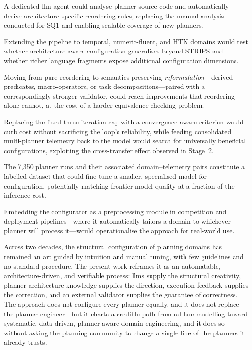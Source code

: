 \begin{description}[style=nextline, leftmargin=0.3cm]
  \item[\textbf{Automated rule extraction.}]
        A dedicated \gls{llm} agent could analyse planner source code and automatically derive architecture-specific reordering rules, replacing the manual analysis conducted for SQ1 and enabling scalable coverage of new planners.

  \item[\textbf{Broader planning formalisms.}]
        Extending the pipeline to temporal, numeric-fluent, and HTN domains would test whether architecture-aware configuration generalises beyond STRIPS and whether richer language fragments expose additional configuration dimensions.

  \item[\textbf{Beyond reordering.}]
        Moving from pure reordering to semantics-preserving \emph{reformulation}---derived predicates, macro-operators, or task decompositions---paired with a correspondingly stronger validator, could reach improvements that reordering alone cannot, at the cost of a harder equivalence-checking problem.

  \item[\textbf{Adaptive stopping and cross-planner feedback.}]
        Replacing the fixed three-iteration cap with a convergence-aware criterion would curb cost without sacrificing the loop's reliability, while feeding consolidated multi-planner telemetry back to the model would search for universally beneficial configurations, exploiting the cross-transfer effect observed in Stage~2.

  \item[\textbf{Fine-tuned configuration models.}]
        The 7{,}350 planner runs and their associated domain--telemetry pairs constitute a labelled dataset that could fine-tune a smaller, specialised model for configuration, potentially matching frontier-model quality at a fraction of the inference cost.

  \item[\textbf{Integration into planning infrastructure.}]
        Embedding the configurator as a preprocessing module in competition and deployment pipelines---where it automatically tailors a domain to whichever planner will process it---would operationalise the approach for real-world use.
\end{description}

Across two decades, the structural configuration of planning domains has remained an art guided by intuition and manual tuning, with few guidelines and no standard procedure.
The present work reframes it as an automatable, architecture-driven, and verifiable process: \glspl{llm} supply the structural creativity, planner-architecture knowledge supplies the direction, execution feedback supplies the correction, and an external validator supplies the guarantee of correctness.
The approach does not configure every planner equally, and it does not replace the planner engineer---but it charts a credible path from ad-hoc modelling toward systematic, data-driven, planner-aware domain engineering, and it does so without asking the planning community to change a single line of the planners it already trusts.
